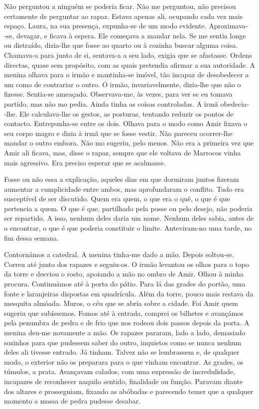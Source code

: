 Não perguntou a ninguém se poderia ficar. Não me perguntou, não precisou
certamente de perguntar ao rapaz. Estava apenas ali, ocupando cada vez
mais espaço. Laura, na sua presença, expunha­‑se de um modo evidente.
Aproximava­‑se, devagar, e ficava à espera. Ele começava a mandar nela.
Se me sentia longe ou distraído, dizia­‑lhe que fosse ao quarto ou à
cozinha buscar alguma coisa. Chamava­‑a para junto de si, sentava­‑a a
seu lado, exigia que se afastasse. Ordens directas, quase sem propósito,
com as quais pretendia afirmar a sua autoridade. A menina olhava para o
irmão e mantinha­‑se imóvel, tão incapaz de desobedecer a um como de
contrariar o outro. O irmão, invariavelmente, dizia­‑lhe que não o
fizesse. Sentia­‑se ameaçado. Observava­‑me, às vezes, para ver se eu
tomava partido, mas não mo pedia. Ainda tinha as coisas controladas. A
irmã obedecia­‑lhe. Ele calculava­‑lhe os gestos, as posturas, tentando
reduzir os pontos de contacto. Entrepunha­‑se entre os dois. Olhava para
o modo como Amir fixava o seu corpo magro e dizia à irmã que se fosse
vestir. Não pareceu ocorrer­‑lhe mandar o outro embora. Não mo sugeriu,
pelo menos. Não era a primeira vez que Amir ali ficava, mas, disse o
rapaz, sempre que ele voltava de Marrocos vinha mais agressivo. Era
preciso esperar que se acalmasse.

Fosse ou não essa a explicação, aqueles dias em que dormiram juntos
fizeram aumentar a cumplicidade entre ambos, mas aprofundaram o
conflito. Tudo era susceptível de ser discutido. Quem era quem, o que
era o quê, o que é que pertencia a quem. O que é que, partilhado pela
posse ou pelo desejo, não poderia ser repartido. A isso, nenhum deles
daria um nome. Nenhum deles sabia, antes de o encontrar, o que é que
poderia constituir o limite. Anteviram­‑no uma tarde, no fim dessa
semana.

Contornámos a catedral. A menina tinha­‑me dado a mão. Depois
soltou­‑se. Correu até junto dos rapazes e seguiu­‑os. O irmão levantou
os olhos para o topo da torre e desviou o rosto, apoiando a mão no ombro
de Amir. Olhou à minha procura. Continuámos até à porta do pátio. Para
lá das grades do portão, uma fonte e laranjeiras dispostas em
quadrícula. Além da torre, pouco mais restava da mesquita almóada.
Muros, o céu que se abria sobre a cidade. Foi Amir quem sugeriu que
subíssemos. Fomos até à entrada, comprei os bilhetes e avançámos pela
penumbra de pedra e de frio que nos rodeou dois passos depois da porta.
A menina deu­‑me novamente a mão. Os rapazes pararam, lado a lado,
demasiado sozinhos para que pudessem saber do outro, inquietos como se
nunca nenhum deles ali tivesse entrado. Já tinham. Talvez não se
lembrassem e, de qualquer modo, o exterior não os preparara para o que
vinham encontrar. As grades, os túmulos, a prata. Avançavam calados, com
uma expressão de incredulidade, incapazes de reconhecer naquilo sentido,
finalidade ou função. Paravam diante dos altares e prosseguiam, fixando
as abóbadas e parecendo temer que a qualquer momento a massa de pedra
pudesse desabar.

